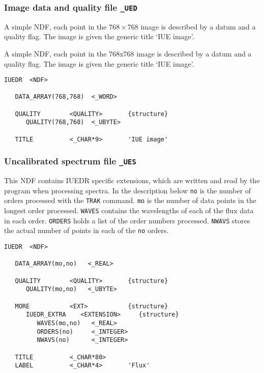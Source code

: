 \subsubsection{Image data and quality file {\tt \_UED}}

\begin{latexonly}
A simple NDF, each point in the $768\times 768$ image is described by a datum
and a quality flag.  The image is given the generic title `IUE image'\@.
\end{latexonly}

\begin{htmlonly}
A simple NDF, each point in the 768x768 image is described by a datum
and a quality flag.  The image is given the generic title `IUE image'\@.
\end{htmlonly}

\begin{verbatim}
IUEDR  <NDF>

   DATA_ARRAY(768,768)  <_WORD>

   QUALITY        <QUALITY>       {structure}
      QUALITY(768,768)  <_UBYTE>

   TITLE          <_CHAR*9>       'IUE image'
\end{verbatim}

\subsubsection{Uncalibrated spectrum file {\tt \_UES}}

This NDF contains IUEDR specific extensions, which are written and read by the
program when processing spectra.  In the description below {\tt no} is
the number of orders processed with the \verb+TRAK+ command.  {\tt mo} is
the number of data points in the longest order processed.
{\tt WAVES} contains the wavelengths of each of the flux data in each order.
{\tt ORDERS} holds a list of the order numbers processed.
{\tt NWAVS} stores the actual number of points in each of the {\tt no} orders.

\begin{verbatim}
IUEDR  <NDF>

   DATA_ARRAY(mo,no)   <_REAL>

   QUALITY        <QUALITY>       {structure}
      QUALITY(mo,no)   <_UBYTE>

   MORE           <EXT>           {structure}
      IUEDR_EXTRA    <EXTENSION>     {structure}
         WAVES(mo,no)   <_REAL>
         ORDERS(no)     <_INTEGER>
         NWAVS(no)      <_INTEGER>

   TITLE          <_CHAR*80>
   LABEL          <_CHAR*4>       'Flux'
\end{verbatim}

